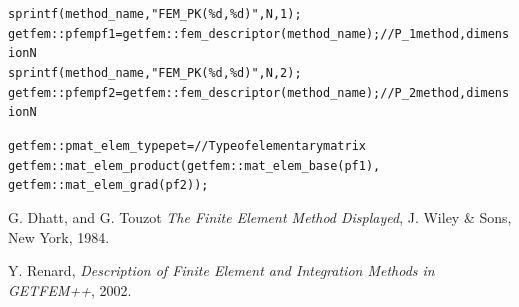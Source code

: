 \documentclass[11pt,a4paper]{article}
\begin{document}
\begin{alltt}

  sprintf(method\_name, "FEM\_PK(\%d, \%d)", N, 1);
  getfem::pfem pf1 = getfem::fem\_descriptor(method\_name); // P_1 method, dimension N
  sprintf(method\_name, "FEM\_PK(\%d, \%d)", N, 2);
  getfem::pfem pf2 = getfem::fem\_descriptor(method\_name); // P_2 method, dimension N  

  getfem::pmat_elem_type pet = // Type of elementary matrix
     getfem::mat_elem_product(getfem::mat_elem_base(pf1),
                              getfem::mat_elem_grad(pf2));
                              
\end{alltt}


\begin{thebibliography}{99}
% 
% 
% 
  G. {\sc Dhatt, and  G. Touzot}
  {\it The Finite Element Method Displayed}, 
 J. Wiley \& Sons,  New York, 1984.

  Y. {\sc Renard},
  {\it Description of Finite Element and Integration Methods in GETFEM++}, 2002.


\end{thebibliography}
\end{document}
